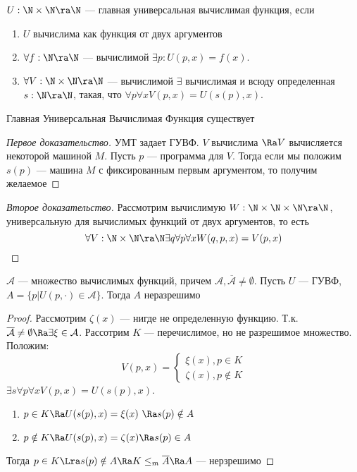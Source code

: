 
\begin{definition}
    \(U: \N\times\N \ra \N\) --- главная универсальная вычислимая функция, если 
    \begin{enumerate}
        \item \(U\) вычислима как функция от двух аргументов
        \item \(\forall f: \N\ra\N\) --- вычислимой \(\exists p: U(p, x) = f(x)\).
        \item \(\forall V: \N\times\N \ra \N\) --- вычислимой \(\exists\) вычислимая и всюду определенная \(s: \N \ra \N\), такая, что \(\forall p \forall x V(p, x) = U(s(p), x)\).
    \end{enumerate}
\end{definition}

\begin{theorem}
    Главная Универсальная Вычислимая Функция существует
\end{theorem}
\begin{proof}[Первое доказательство]
    УМТ задает ГУВФ. \(V\) вычислима \(\Ra V\) вычисляется некоторой машиной \(M\). Пусть \(p\) --- программа для \(V\). Тогда если мы положим \(s(p)\) --- машина \(M\) с фиксированным первым аргументом, то получим желаемое
\end{proof}
\begin{proof}[Второе доказательство]
    Рассмотрим вычислимую \(W: \N\times\N\times\N \ra \N\), универсальную для вычислимых функций от двух аргументов, то есть 
    \[\forall V: \N \times \N \ra \N \exists q \forall p \forall x W(q, p, x) = V(p, x)\]
\end{proof}

\begin{theorem}
    \(\mathcal{A}\) --- множество вычислимых функций, причем \(\mathcal{A}, \overline{\mathcal{A}} \ne \emptyset\). Пусть \(U\) --- ГУВФ, \(A = \{p| U(p, \cdot) \in \mathcal{A}\} \). Тогда \(A\) неразрешимо
\end{theorem}
\begin{proof}
    Рассмотрим \(\zeta(x)\) --- нигде не определенную функцию. Т.к. \(\overline{\mathcal{A}} \ne \emptyset \Ra \exists \xi \in \mathcal{A}\). Рассотрим \(K\) --- перечислимое, но не разрешимое множество. Положим:
    \[V(p, x) = \left\{\begin{array}{l}
        \xi(x), p \in K \\
        \zeta(x), p \notin K
    \end{array}\right.\]
    \(\exists s \forall p \forall x V(p, x) = U(s(p), x)\).
    \begin{enumerate}
        \item \(p \in K \Ra U(s(p), x) = \xi(x)\ \Ra s(p)\notin A\)
        \item \(p \notin K \Ra U(s(p), x) = \zeta(x) \Ra s(p)\in A\)
    \end{enumerate}
    Тогда \(p \in K \Lra s(p) \notin A \Ra K \le_m \overline{A} \Ra A\) --- нерзрешимо
\end{proof}

